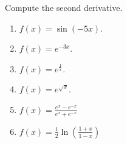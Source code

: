 Compute the second derivative.
\begin{multicols}{3}
\begin{enumerate}
\item $\displaystyle f(x)=\sin (-5x)$. 

\item $\displaystyle f(x)=e^{-3x}$. 

\item $\displaystyle f(x)=e^{\frac{1}x}$. 

\item $\displaystyle f(x)=e^{\sqrt{x}}$. 

\item $\displaystyle f(x)=\frac{e^{x}-e^{-x}}{e^x+e^{-x}} $

\item $\displaystyle f(x)=\frac{1}2\ln \left(\frac{1+x}{1-x}\right) $

\end{enumerate}
\end{multicols}
